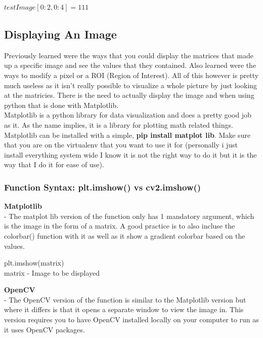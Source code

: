 \documentclass[fleqn]{article}
\begin{document}
    \begin{center}
      $testImage[0:2,0:4] = 111$
    \end{center}

    \subsection{Displaying An Image}
    Previously learned were the ways that you could display the matrices that made up a specific image and see the values that they contained. Also learned were the ways to modify a pixel or a ROI (Region of Interest). All of this however is pretty much useless as it isn't really possible to visualize a whole picture by just looking at the matricies. There is the need to actually display the image and when using python that is done with Matplotlib.\\
    Matplotlib is a python library for data visualization and does a pretty good job as it. As the name implies, it is a library for plotting math related things. Matplotlib can be installed with a simple, \textbf{pip install matplot lib}. Make sure that you are on the virtualenv that you want to use it for (personally i just install everything system wide I know it is not the right way to do it but it is the way that I do it for ease of use).

    \subsubsection{Function Syntax: plt.imshow() vs cv2.imshow()}
    \indent \textbf{Matplotlib}\\
    \indent \indent - The matplot lib version of the function only has 1 mandatory argument, which is the image in the form of a matrix. A good practice is to also incluse the colorbar() function with it as well as it show a gradient colorbar based on the values.

    \begin{center}
      plt.imshow(matrix)\\
      matrix - Image to be displayed
    \end{center}

    \newpage
    \clearpage

    \textbf{OpenCV}\\
    \indent \indent - The OpenCV version of the function is similar to the Matplotlib version but where it differs is that it opens a separate window to view the image in. This version requires you to have OpenCV installed locally on your computer to run as it uses OpenCV packages.
\end{document}
